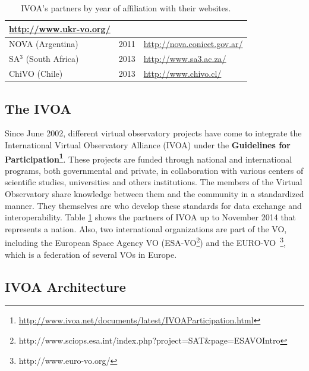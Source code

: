 \begin{table}[h]
\begin{tabular}{|l|l|l|}
		\url{http://www.ukr-vo.org/} \\
	\hline
	NOVA (Argentina) & 2011 & %
		\url{http://nova.conicet.gov.ar/} \\
	\hline
	SA$^3$ (South Africa) & 2013 & %
		\url{http://www.sa3.ac.za/} \\
	\hline
    ChiVO (Chile) & 2013 & %
		\url{http://www.chivo.cl/} \\
	\hline
\end{tabular}
\caption{IVOA's partners by year of affiliation with their websites.}
\label{table:partners}
\end{table}
\normalsize

\subsection{The IVOA}

Since June 2002, different virtual observatory projects have come to integrate the
International Virtual Observatory Alliance (IVOA) under the \textbf{Guidelines
for
Participation\footnote{\url{http://www.ivoa.net/documents/latest/IVOAParticipation.html}}}. 
These projects are funded through national and international programs, both governmental and 
private, in collaboration with various centers of scientific studies, universities and
others institutions. The members of the Virtual Observatory share
knowledge between them and the community in a standardized manner. They
themselves are who develop these standards for data exchange and
interoperability.
Table \ref{table:partners} shows the partners of IVOA up to
November 2014 that represents a nation. Also, two international organizations
are part of the VO, including the European Space Agency VO
(ESA-VO\footnote{http://www.sciops.esa.int/index.php?project=SAT\&page=ESAVOIntro})
and the EURO-VO~\footnote{http://www.euro-vo.org/}, which is a federation of several VOs in Europe.

\subsection{IVOA Architecture}

